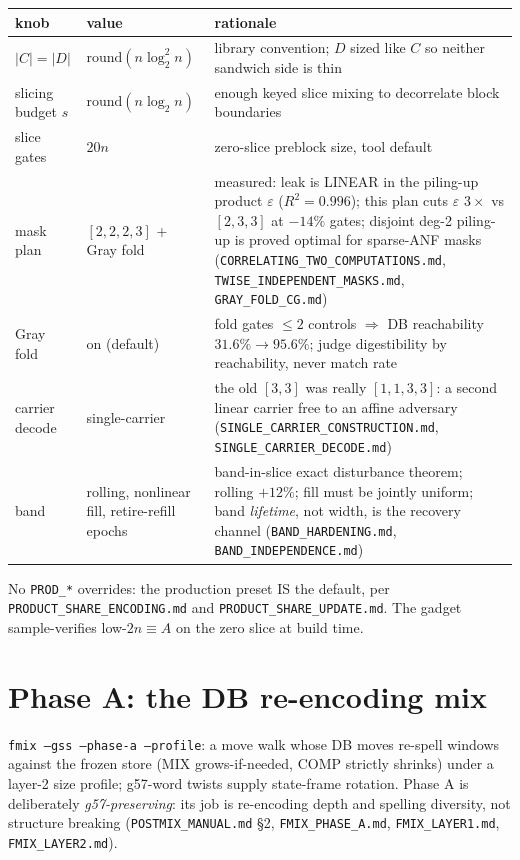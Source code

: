 \documentclass[11pt]{article}
\newcommand{\g}{\textsf{g57}}
\newcommand{\doc}[1]{\texttt{#1}}
\begin{document}
\begin{table}[H]\small
\begin{tabular}{L{3.2cm} L{3.2cm} L{8.2cm}}
\toprule
knob & value & rationale \\
\midrule
$|C|=|D|$ & $\mathrm{round}(n\log_2^2 n)$ & library convention; $D$ sized like $C$ so neither sandwich side is thin \\
slicing budget $s$ & $\mathrm{round}(n\log_2 n)$ & enough keyed slice mixing to decorrelate block boundaries \\
slice gates & $20n$ & zero-slice preblock size, tool default \\
mask plan & $[2,2,2,3]$ + Gray fold & measured: leak is LINEAR in the piling-up product $\varepsilon$ ($R^2=0.996$); this plan cuts $\varepsilon$ $3\times$ vs $[2,3,3]$ at $-14\%$ gates; disjoint deg-2 piling-up is proved optimal for sparse-ANF masks (\doc{CORRELATING\_TWO\_COMPUTATIONS.md}, \doc{TWISE\_INDEPENDENT\_MASKS.md}, \doc{GRAY\_FOLD\_CG.md}) \\
Gray fold & on (default) & fold gates $\le 2$ controls $\Rightarrow$ DB reachability $31.6\%\to95.6\%$; judge digestibility by reachability, never match rate \\
carrier decode & single-carrier & the old $[3,3]$ was really $[1,1,3,3]$: a second linear carrier free to an affine adversary (\doc{SINGLE\_CARRIER\_CONSTRUCTION.md}, \doc{SINGLE\_CARRIER\_DECODE.md}) \\
band & rolling, nonlinear fill, retire-refill epochs & band-in-slice exact disturbance theorem; rolling $+12\%$; fill must be jointly uniform; band \emph{lifetime}, not width, is the recovery channel (\doc{BAND\_HARDENING.md}, \doc{BAND\_INDEPENDENCE.md}) \\
\bottomrule
\end{tabular}
\end{table}

No \texttt{PROD\_*} overrides: the production preset IS the default, per
\doc{PRODUCT\_SHARE\_ENCODING.md} and \doc{PRODUCT\_SHARE\_UPDATE.md}. The
gadget sample-verifies low-$2n \equiv A$ on the zero slice at build time.

\section{Phase A: the DB re-encoding mix}

\texttt{fmix --gss --phase-a --profile}: a move walk whose DB moves
re-spell windows against the frozen store (MIX grows-if-needed, COMP
strictly shrinks) under a layer-2 size profile; \g-word twists supply
state-frame rotation. Phase A is deliberately \emph{\g-preserving}: its
job is re-encoding depth and spelling diversity, not structure breaking
(\doc{POSTMIX\_MANUAL.md} \S2, \doc{FMIX\_PHASE\_A.md},
\doc{FMIX\_LAYER1.md}, \doc{FMIX\_LAYER2.md}).
\end{document}
